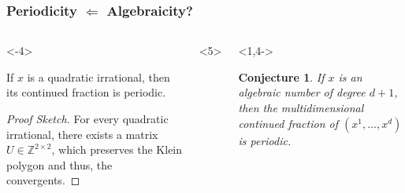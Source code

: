 \documentclass[aspectratio=169]{beamer}
\newtheorem{conjecture}{Conjecture}
\begin{document}
\begin{frame}
  \frametitle{Periodicity $\Leftarrow$ Algebraicity?}
  \small
  \begin{columns}
    \begin{onlyenv}<-4>
      \begin{theorem}
        If $x$ is a quadratic irrational,
        then its continued fraction is periodic.
      \end{theorem}

      \begin{proof}[Proof Sketch]
        For every quadratic irrational,
        there exists a matrix $U ∈ ℤ^{2×2}$, which preserves the Klein polygon and thus, the convergents.
      \end{proof}
    \end{onlyenv}
    \begin{onlyenv}<5>
      \begin{center}
      \end{center}
    \end{onlyenv}

    \begin{onlyenv}<1,4->
      \begin{conjecture}
        If $x$ is an algebraic number of degree $d+1$,
        then the multidimensional continued fraction of $(x^1, …, x^d)$ is
        periodic.
      \end{conjecture}


\end{onlyenv}
\end{columns}
\end{frame}
\end{document}

